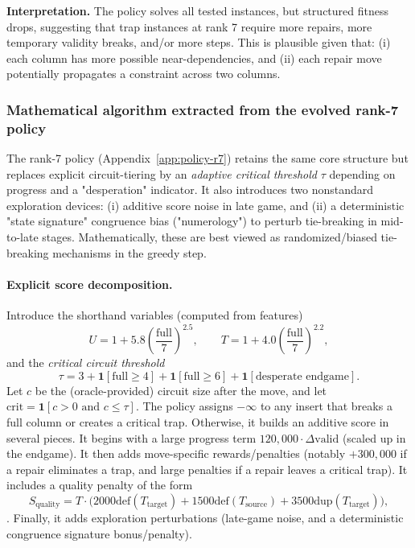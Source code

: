 \documentclass[11pt]{amsart}
\begin{document}
\noindent\textbf{Interpretation.}
The policy solves all tested instances, but structured fitness drops, suggesting that trap instances at rank 7 require more repairs, more temporary validity breaks, and/or more steps.
This is plausible given that:
(i) each column has more possible near-dependencies, and
(ii) each repair move potentially propagates a constraint across two columns.

\subsubsection{Mathematical algorithm extracted from the evolved rank-7 policy}

The rank-7 policy (Appendix~\ref{app:policy-r7}) retains the same core structure but replaces explicit circuit-tiering by an \emph{adaptive critical threshold} $\tau$ depending on progress and a "desperation" indicator.
It also introduces two nonstandard exploration devices:
(i) additive score noise in late game, and (ii) a deterministic "state signature" congruence bias ("numerology") to perturb tie-breaking in mid-to-late stages.
Mathematically, these are best viewed as randomized/biased tie-breaking mechanisms in the greedy step.



\paragraph{Explicit score decomposition.}
Introduce the shorthand variables (computed from features)
\[
U = 1 + 5.8\left(\frac{\mathrm{full}}{7}\right)^{2.5},\qquad
T = 1 + 4.0\left(\frac{\mathrm{full}}{7}\right)^{2.2},
\]
and the \emph{critical circuit threshold}
\[
\tau = 3 + \mathbf{1}[\mathrm{full}\ge 4] + \mathbf{1}[\mathrm{full}\ge 6] + \mathbf{1}[\text{desperate endgame}].
\]
Let $c$ be the (oracle-provided) circuit size after the move, and let
$\mathrm{crit}=\mathbf{1}[c>0\text{ and }c\le \tau]$.
The policy assigns $-\infty$ to any insert that breaks a full column or creates a critical trap.
Otherwise, it builds an additive score in several pieces. It begins with a large progress term $120{,}000\cdot \Delta\mathrm{valid}$ (scaled up in the endgame). It then adds move-specific rewards/penalties (notably $+300{,}000$ if a repair eliminates a trap, and large penalties if a repair leaves a critical trap). It includes a quality penalty of the form
\[
S_{\mathrm{quality}} = T\cdot\bigl(2000\mathrm{def}(T_{\mathrm{target}})+1500\mathrm{def}(T_{\mathrm{source}})+3500\mathrm{dup}(T_{\mathrm{target}})\bigr),
\]. Finally, it adds exploration perturbations (late-game noise, and a deterministic congruence signature bonus/penalty).
\end{document}

